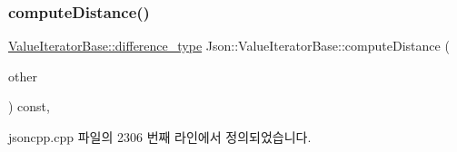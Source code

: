 \subsubsection{\texorpdfstring{compute\+Distance()}{computeDistance()}}
{\footnotesize\ttfamily \hyperlink{class_json_1_1_value_iterator_base_a4e44bf8cbd17ec8d6e2c185904a15ebd}{Value\+Iterator\+Base\+::difference\+\_\+type} Json\+::\+Value\+Iterator\+Base\+::compute\+Distance (\begin{DoxyParamCaption}\item[{const \hyperlink{class_json_1_1_value_iterator_base_a9d2a940d03ea06d20d972f41a89149ee}{Self\+Type} \&}]{other }\end{DoxyParamCaption}) const\hspace{0.3cm}{\ttfamily [protected]}, {\ttfamily [inherited]}}



jsoncpp.\+cpp 파일의 2306 번째 라인에서 정의되었습니다.


